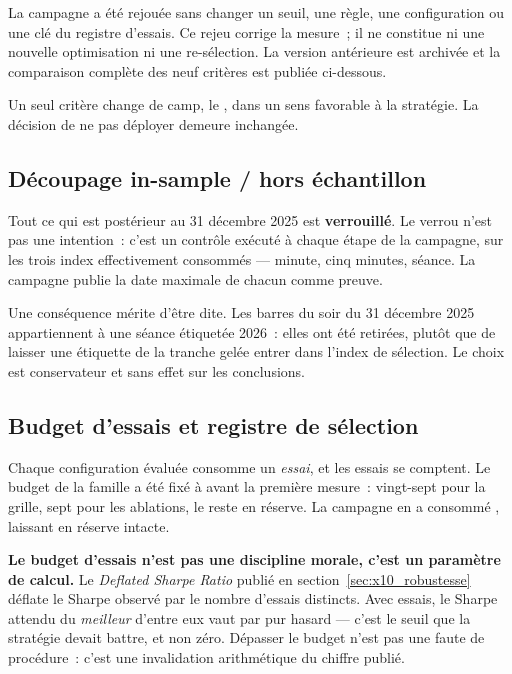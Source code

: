 La campagne a été rejouée sans changer un seuil, une règle, une configuration
ou une clé du registre d'essais. Ce rejeu corrige la mesure~; il ne constitue
ni une nouvelle optimisation ni une re-sélection. La version antérieure est
archivée et la comparaison complète des neuf critères est publiée ci-dessous.



Un seul critère change de camp, le , dans un sens favorable à la
stratégie. La décision de ne pas déployer demeure inchangée.

\subsection{Découpage in-sample / hors échantillon}

Tout ce qui est postérieur au 31 décembre 2025 est \textbf{verrouillé}. Le
verrou n'est pas une intention~: c'est un contrôle exécuté à chaque étape de
la campagne, sur les trois index effectivement consommés --- minute, cinq
minutes, séance. La campagne publie la date maximale de chacun comme preuve.

Une conséquence mérite d'être dite. Les barres du soir du 31 décembre 2025
appartiennent à une séance étiquetée 2026~: elles ont été retirées, plutôt que
de laisser une étiquette de la tranche gelée entrer dans l'index de sélection.
Le choix est conservateur et sans effet sur les conclusions.

\subsection{Budget d'essais et registre de sélection}

Chaque configuration évaluée consomme un \emph{essai}, et les essais se
comptent. Le budget de la famille a été fixé à \XTenTrialsCeiling{} avant la
première mesure~: vingt-sept pour la grille, sept pour les ablations, le reste
en réserve. La campagne en a consommé \XTenTrialsCount, laissant
\XTenTrialsReserve{} en réserve intacte.

\begin{insightbox}
\textbf{Le budget d'essais n'est pas une discipline morale, c'est un
paramètre de calcul.} Le \emph{Deflated Sharpe Ratio} publié en
section~\ref{sec:x10_robustesse} déflate le Sharpe observé par le nombre
d'essais distincts. Avec \XTenTrialsCount{} essais, le Sharpe attendu du
\emph{meilleur} d'entre eux vaut \metric{\XTenExpectedMaxSharpe} par pur
hasard --- c'est le seuil que la stratégie devait battre, et non zéro.
Dépasser le budget n'est pas une faute de procédure~: c'est une invalidation
arithmétique du chiffre publié.
\end{insightbox}

